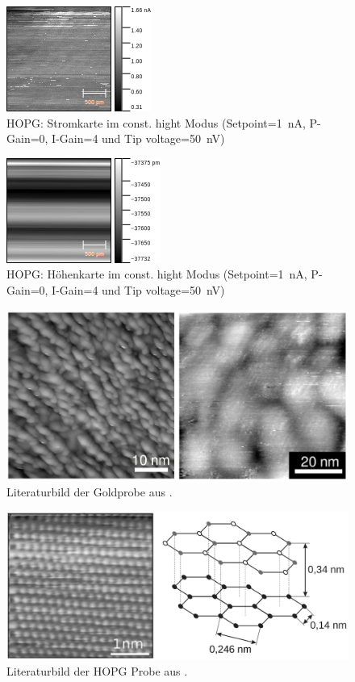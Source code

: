 \documentclass[sn-mathphys-num,iicol]{sn-jnl}
\theoremstyle{thmstyleone}
\theoremstyle{thmstyletwo}
\theoremstyle{thmstylethree}
\begin{document}
\begin{figure}[h]
        \centering
        \includegraphics[width=.5\textwidth]{../data/Graphit7_current.png}
        \caption{HOPG: Stromkarte im const. hight Modus (Setpoint=\SI{1}{\nano A}, P-Gain=\SI{0}{}, I-Gain=\SI{4}{} und Tip voltage=\SI{50}{\nano V})} \label{fig:gr2nm50nVc3}
\end{figure}
\begin{figure}[h]
        \centering
        \includegraphics[width=.5\textwidth]{../data/Graphit7_z.png}
        \caption{HOPG: Höhenkarte im const. hight Modus (Setpoint=\SI{1}{\nano A}, P-Gain=\SI{0}{}, I-Gain=\SI{4}{} und Tip voltage=\SI{50}{\nano V})} \label{fig:gr2nm50nVz3}
\end{figure}
\begin{figure}[h]
  \centering
  \includegraphics[width=.5\textwidth]{422_gold_lit.png}
  \caption{Literaturbild der Goldprobe aus \cite{anleitung422}.} \label{fig:gold_lit}
\end{figure}
\begin{figure}[h]
  \centering
  \includegraphics[width=.5\textwidth]{422_HOPG_lit.png}
  \caption{Literaturbild der HOPG Probe aus \cite{anleitung422}.} \label{fig:hopg_lit}
\end{figure}
\end{document}

